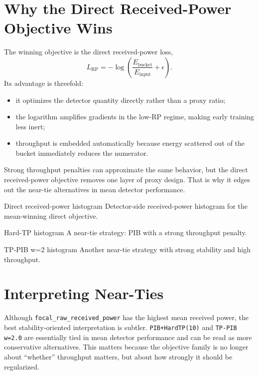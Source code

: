 \section{Why the Direct Received-Power Objective Wins}

The winning objective is the direct received-power loss,
\begin{equation}
L_{\mathrm{RP}} = -\log\!\left(\frac{E_{\mathrm{bucket}}}{E_{\mathrm{input}}} + \epsilon\right).
\end{equation}
Its advantage is threefold:
\begin{itemize}
  \item it optimizes the detector quantity directly rather than a proxy ratio;
  \item the logarithm amplifies gradients in the low-RP regime, making early
  training less inert;
  \item throughput is embedded automatically because energy scattered out of the
  bucket immediately reduces the numerator.
\end{itemize}

Strong throughput penalties can approximate the same behavior, but the direct
received-power objective removes one layer of proxy design. That is why it
edges out the near-tie alternatives in mean detector performance.

  {Direct received-power histogram}
  {Detector-side received-power histogram for the mean-winning direct
  objective.}

  {Hard-TP histogram}
  {A near-tie strategy: PIB with a strong throughput penalty.}

  {TP-PIB w=2 histogram}
  {Another near-tie strategy with strong stability and high throughput.}

\section{Interpreting Near-Ties}

Although \texttt{focal\_raw\_received\_power} has the highest mean received power, the best
stability-oriented interpretation is subtler. \texttt{PIB+HardTP(10)} and
\texttt{TP-PIB w=2.0} are essentially tied in mean detector performance and can be read as
more conservative alternatives. This matters because the objective family is no
longer about ``whether'' throughput matters, but about how strongly it should be
regularized.

